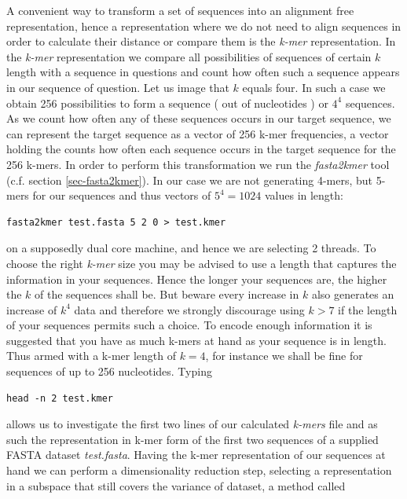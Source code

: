 A convenient way to transform a set of sequences into an alignment
free representation, hence a representation where we do not need to
align sequences in order to calculate their distance or compare them
is the \emph{k-mer} representation. In the \emph{k-mer}
representation we compare all possibilities of sequences of certain $k$
length with a sequence in questions and count how often such a
sequence appears in our sequence of question. Let us image that $k$ equals
four. In such a case we obtain 256 possibilities to form a sequence ( out of
nucleotides ) or $4^4$ sequences. As we count how often any of these
sequences occurs in our target sequence, we can represent the target
sequence as a vector of 256 k-mer frequencies, a vector holding the
counts how often each sequence occurs in the target sequence for the
256 k-mers.
In order to perform this transformation we run the
\emph{fasta2kmer} tool (c.f. section \ref{sec-fasta2kmer}). In our case
we are not generating 4-mers, but 5-mers for our sequences and thus
vectors of $5^{4}=1024$ values in length:
\begin{lstlisting}
fasta2kmer test.fasta 5 2 0 > test.kmer
\end{lstlisting}
on a supposedly dual core machine, and hence we are selecting 2 threads. To
choose the right \emph{k-mer} size you may be advised to use a length
that captures the information in your sequences. Hence the longer your
sequences are, the higher the $k$ of the sequences shall be. But
beware every increase in $k$ also generates an increase of $k^4$
data and therefore we strongly discourage using $k > 7$ if the length of
your sequences permits such a choice.
To encode enough information it is suggested
that you have as much k-mers at hand as your sequence is in
length. Thus armed with a k-mer length of $k=4$, for instance we shall
be fine for sequences of up to 256 nucleotides.
Typing
\begin{lstlisting}
head -n 2 test.kmer
\end{lstlisting}
allows us to investigate the first two lines of our calculated \emph{k-mers}
file and as such the representation in k-mer form of the first two
sequences of a supplied FASTA dataset \emph{test.fasta}.
Having the k-mer representation of our sequences at hand we
can perform a dimensionality reduction step, selecting a representation in
a subspace that still covers the variance of dataset, a method called
